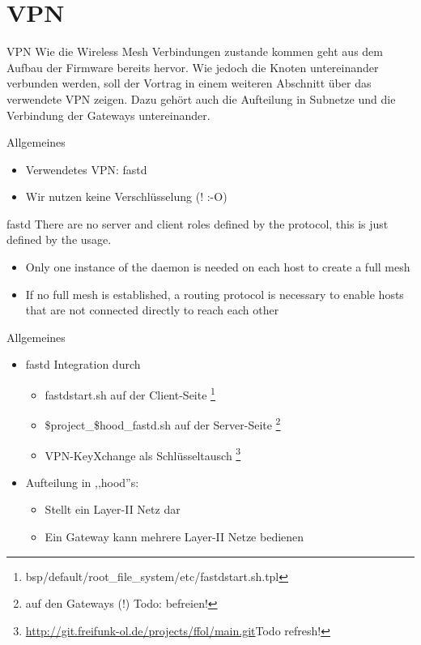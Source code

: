 \section{VPN}

\begin{frame}{VPN}
Wie die Wireless Mesh Verbindungen zustande kommen geht aus dem
Aufbau der Firmware bereits hervor. Wie jedoch die Knoten
untereinander verbunden werden, soll der Vortrag in einem weiteren
Abschnitt über das verwendete VPN zeigen. Dazu gehört auch die
Aufteilung in Subnetze und die Verbindung der Gateways
untereinander.
\end{frame}

\begin{frame}{Allgemeines}
    \begin{itemize}
        \item Verwendetes VPN: fastd
        \item Wir nutzen keine Verschlüsselung (! :-O)
    \end{itemize}
    \begin{block}{fastd}
        There are no server and client roles defined by the
        protocol, this is just defined by the usage.
        \begin{itemize}
            \item Only one instance of the daemon is needed on each
                host to create a full mesh
            \item If no full mesh is established, a routing protocol
                is necessary to enable hosts that are not connected
                directly to reach each other
        \end{itemize}
    \end{block}
\end{frame}

\begin{frame}{Allgemeines}
    \begin{itemize}
        \item fastd Integration durch
        \begin{itemize}
            \item fastdstart.sh auf der Client-Seite
                \footnote{bsp/default/root\_file\_system/etc/fastdstart.sh.tpl}
            \item \$project\_\$hood\_fastd.sh auf der Server-Seite
                \footnote{auf den Gateways (!) Todo: befreien!}
            \item VPN-KeyXchange als Schlüsseltausch
                \footnote{\url{
                    http://git.freifunk-ol.de/projects/ffol/main.git}Todo refresh!}
        \end{itemize}
        \item Aufteilung in ,,hood''s:
        \begin{itemize}
            \item Stellt ein Layer-II Netz dar
            \item Ein Gateway kann mehrere Layer-II Netze bedienen
        \end{itemize}
    \end{itemize}
\end{frame}

